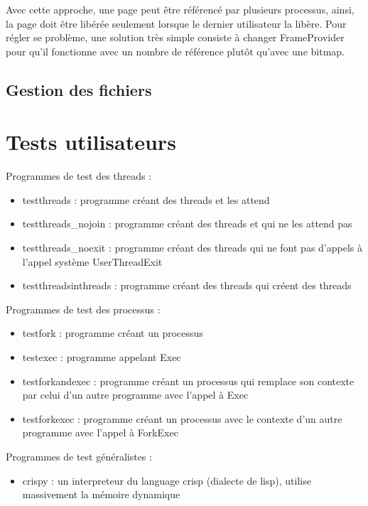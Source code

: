 \documentclass{article}
\begin{document}
Avec cette approche, une page peut être référencé par plusieurs processus, ainsi, la page doit être libérée seulement lorsque le dernier utilisateur la libère.  Pour régler se problème, une solution très simple consiste à changer FrameProvider pour qu'il fonctionne avec un nombre de référence plutôt qu'avec une bitmap.
\subsection{Gestion des fichiers}

\section{Tests utilisateurs}

Programmes de test des threads :

\begin{itemize}
  \item testthreads : programme créant des threads et les attend
  \item testthreads\_nojoin : programme créant des threads et qui ne les attend pas
  \item testthreads\_noexit : programme créant des threads qui ne font pas d'appels à l'appel
  système UserThreadExit
  \item testthreadsinthreads : programme créant des threads qui créent des threads

\end{itemize}

Programmes de test des processus :

\begin{itemize}
  \item testfork : programme créant un processus
  \item testexec : programme appelant Exec
  \item testforkandexec : programme créant un processus qui remplace son contexte par celui d'un autre programme avec l'appel à Exec
  \item testforkexec : programme créant un processus avec le contexte d'un autre programme avec l'appel à ForkExec
\end{itemize}

Programmes de test généralistes :
\begin{itemize}
\item crispy : un interpreteur du language crisp (dialecte de lisp),
  utilise massivement la mémoire dynamique
\end{itemize}
\end{document}
